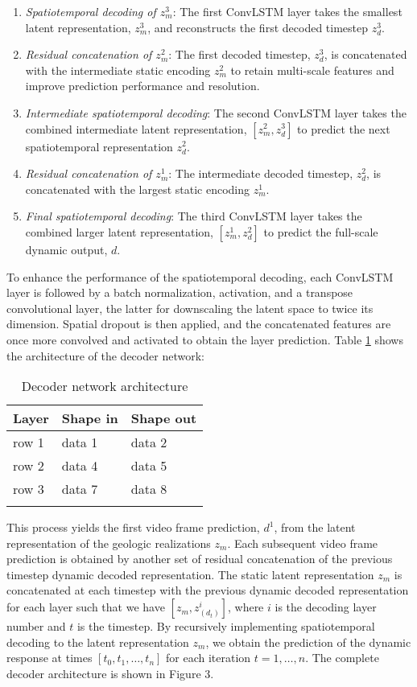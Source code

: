 \documentclass[default,iicol]{sn-jnl}
\begin{document}
\begin{enumerate}[Step 1.]
\item \textit{Spatiotemporal decoding of $z_m^3$}: The first ConvLSTM layer takes the smallest latent representation, $z_m^3$, and reconstructs the first decoded timestep $z_d^3$.
\item \textit{Residual concatenation of $z_m^2$}: The first decoded timestep, $z_d^3$, is concatenated with the intermediate static encoding $z_m^2$ to retain multi-scale features and improve prediction performance and resolution.
\item \textit{Intermediate spatiotemporal decoding}: The second ConvLSTM layer takes the combined intermediate latent representation, $[z_m^2,z_d^3]$ to predict the next spatiotemporal representation $z_d^2$. 
\item \textit{Residual concatenation of $z_m^1$}: The intermediate decoded timestep, $z_d^2$, is concatenated with the largest static encoding $z_m^1$.
\item \textit{Final spatiotemporal decoding}: The third ConvLSTM layer takes the combined larger latent representation, $[z_m^1,z_d^2]$ to predict the full-scale dynamic output, $d$.
\end{enumerate}

To enhance the performance of the spatiotemporal decoding, each ConvLSTM layer is followed by a batch normalization, activation, and a transpose convolutional layer, the latter for downscaling the latent space to twice its dimension. Spatial dropout is then applied, and the concatenated features are once more convolved and activated to obtain the layer prediction. Table \ref{tab2} shows the architecture of the decoder network:

\begin{table}[h]
\caption{Decoder network architecture}\label{tab2}
\begin{tabular}{@{}lll@{}}
\toprule
Layer & Shape in  & Shape out\\
\midrule
row 1    &   data 1   &   data 2\\
row 2    &   data 4   &   data 5\\
row 3    &   data 7   &   data 8\\
\botrule
\end{tabular}
\end{table}

This process yields the first video frame prediction, $d^1$, from the latent representation of the geologic realizations $z_m$. Each subsequent video frame prediction is obtained by another set of residual concatenation of the previous timestep dynamic decoded representation. The static latent representation $z_m$ is concatenated at each timestep with the previous dynamic decoded representation for each layer such that we have $[z_m,z_(d_t)^i]$, where $i$ is the decoding layer number and $t$ is the timestep. By recursively implementing spatiotemporal decoding to the latent representation $z_m$, we obtain the prediction of the dynamic response at times $[t_0,t_1,…,t_n]$ for each iteration $t=1,…,n$. The complete decoder architecture is shown in Figure 3.
\end{document}
